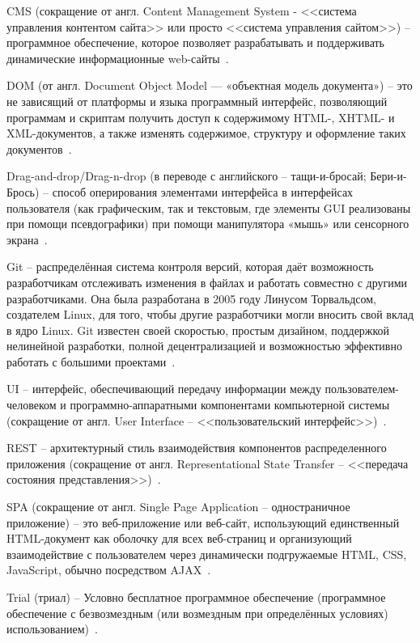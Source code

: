 CMS (сокращение от англ. Content Management System - <<система управления контентом сайта>> или просто <<система управления сайтом>>) -- программное обеспечение, которое позволяет разрабатывать и поддерживать динамические информационные web-сайты~\cite{cms}.

DOM (от англ. Document Object Model — «объектная модель документа») -- это не зависящий от платформы и языка программный интерфейс, позволяющий программам и скриптам получить доступ к содержимому HTML-, XHTML- и XML-документов, а также изменять содержимое, структуру и оформление таких документов~\cite{wiki_dom}.

Drag-and-drop/Drag-n-drop (в переводе с английского -- тащи-и-бросай; Бери-и-Брось) -- способ оперирования элементами интерфейса в интерфейсах пользователя (как графическим, так и текстовым, где элементы GUI реализованы при помощи псевдографики) при помощи манипулятора «мышь» или сенсорного экрана~\cite{wiki_dnd}.

Git -- распределённая система контроля версий, которая даёт возможность разработчикам отслеживать изменения в файлах и работать совместно с другими разработчиками. Она была разработана в 2005 году Линусом Торвальдсом, создателем Linux, для того, чтобы другие разработчики могли вносить свой вклад в ядро Linux. Git известен своей скоростью, простым дизайном, поддержкой нелинейной разработки, полной децентрализацией и возможностью эффективно работать с большими проектами~\cite{git}.

UI --  интерфейс, обеспечивающий передачу информации между пользователем-человеком и программно-аппаратными компонентами компьютерной системы (сокращение от англ.  User Interface -- <<пользовательский интерфейс>>)~\cite{wiki_ui}.

REST -- архитектурный стиль взаимодействия компонентов распределенного приложения (сокращение от англ. Representational State Transfer -- <<передача состояния представления>>)~\cite{wiki_rest}.

SPA (сокращение от англ. Single Page Application -- одностраничное приложение) -- это веб-приложение или веб-сайт, использующий единственный HTML-документ как оболочку для всех веб-страниц и организующий взаимодействие с пользователем через динамически подгружаемые HTML, CSS, JavaScript, обычно посредством AJAX~\cite{wiki_spa}.

Trial (триал) -- Условно бесплатное программное обеспечение (программное обеспечение с безвозмездным (или возмездным при определённых условиях) использованием)~\cite{wiki_trial}.

